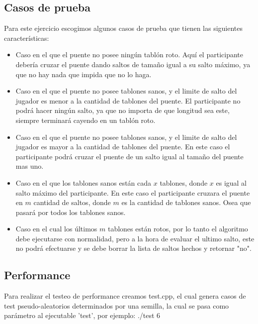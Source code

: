 \subsection{Casos de prueba}

Para este ejercicio escogimos algunos casos de prueba que tienen las siguientes características:

\begin{itemize}

\item Caso en el que el puente no posee ningún tablón roto. Aquí el participante debería cruzar el puente dando saltos de tamaño igual a su salto máximo, ya que no hay nada que impida que no lo haga.

\item Caso en el que el puente no posee tablones sanos, y el limite de salto del jugador es menor a la cantidad de tablones del puente. El participante no podrá hacer ningún salto, ya que no importa de que longitud sea este, siempre terminará cayendo en un tablón roto.

\item Caso en el que el puente no posee tablones sanos, y el limite de salto del jugador es mayor a la cantidad de tablones del puente. En este caso el participante podrá cruzar el puente de un salto igual al tamaño del puente mas uno.

\item Caso en el que los tablones sanos están cada $x$ tablones, donde $x$ es igual al salto máximo del participante. En este caso el participante cruzara el puente en $m$ cantidad de saltos, donde $m$ es la cantidad de tablones sanos. Osea que pasará por todos los tablones sanos.

\item Caso en el cual los últimos $m$ tablones están rotos, por lo tanto el algoritmo debe ejecutarse con normalidad, pero a la hora de evaluar el ultimo salto, este no podrá efectuarse y se debe borrar la lista de saltos hechos y retornar "no".

\end{itemize}


\subsection{Performance}

Para realizar el testeo de performance creamos test.cpp, el cual genera casos de test pseudo-aleatorios determinados por una semilla, la cual se pasa como parámetro al ejecutable 'test', por ejemplo: ./test 6

